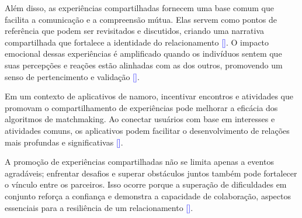 Além disso, as experiências compartilhadas fornecem uma base comum que facilita a comunicação e a compreensão mútua. Elas servem como pontos de referência que podem ser revisitados e discutidos, criando uma narrativa compartilhada que fortalece a identidade do relacionamento \textcolor{blue}{[\cite{Montoya2013}]}. O impacto emocional dessas experiências é amplificado quando os indivíduos sentem que suas percepções e reações estão alinhadas com as dos outros, promovendo um senso de pertencimento e validação \textcolor{blue}{[\cite{Montoya2008}]}.

Em um contexto de aplicativos de namoro, incentivar encontros e atividades que promovam o compartilhamento de experiências pode melhorar a eficácia dos algoritmos de matchmaking. Ao conectar usuários com base em interesses e atividades comuns, os aplicativos podem facilitar o desenvolvimento de relações mais profundas e significativas \textcolor{blue}{[\cite{Chu2023}]}.

A promoção de experiências compartilhadas não se limita apenas a eventos agradáveis; enfrentar desafios e superar obstáculos juntos também pode fortalecer o vínculo entre os parceiros. Isso ocorre porque a superação de dificuldades em conjunto reforça a confiança e demonstra a capacidade de colaboração, aspectos essenciais para a resiliência de um relacionamento \textcolor{blue}{[\cite{Montoya2008}]}.
